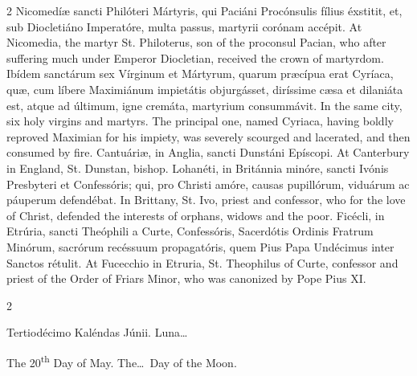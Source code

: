 \begin{paracol}{2}
\switchcolumn*
{}
Nicomedíæ sancti 
 Philóteri Mártyris, qui Paciáni Procónsulis fílius 
 éxstitit, et, sub 
 Diocletiáno Imperatóre, multa passus, martyrii corónam accépit.
\switchcolumn
{}
At Nicomedia, the martyr St. 
 Philoterus, son of the proconsul Pacian, who after suffering much under 
 Emperor Diocletian, received the crown of martyrdom.
\switchcolumn*
{}
Ibídem sanctárum sex 
 Vírginum et Mártyrum, quarum præcípua erat Cyríaca, quæ, cum líbere 
 Maximiánum impietátis objurgásset, diríssime cæsa et dilaniáta est, atque ad 
 últimum, igne cremáta, martyrium consummávit.
\switchcolumn
{}
In the same city, six holy virgins 
 and martyrs. The principal one, named Cyriaca, having boldly reproved 
 Maximian for his impiety, was severely scourged and lacerated, and then 
 consumed by fire.
\switchcolumn*
{}
Cantuáriæ, in Anglia, 
 sancti Dunstáni Epíscopi.
\switchcolumn
{}
At Canterbury in England, St. 
 Dunstan, bishop.
\switchcolumn*
{}
Lohanéti, in Británnia minóre, sancti Ivónis Presbyteri et Confessóris; qui, pro Christi amóre, 
 causas pupillórum, viduárum ac páuperum defendébat.
\switchcolumn
{}
In Brittany, St. Ivo, priest and 
 confessor, who for the love of Christ, defended the interests of orphans, 
 widows and the poor.
\switchcolumn*
{}
Ficécli, in Etrúria, 
 sancti Theóphili a Curte, Confessóris, Sacerdótis Ordinis Fratrum Minórum, 
 sacrórum recéssuum propagatóris, quem Pius Papa Undécimus inter Sanctos 
 rétulit.
\switchcolumn
{}
At Fucecchio in Etruria, St. 
 Theophilus of Curte, confessor and priest of the Order of Friars Minor, who 
 was canonized by Pope Pius XI.
\switchcolumn*
{}
\end{paracol}


\begin{paracol}{2}
\begin{center}{\color{gregoriocolor} Tertiodécimo Kaléndas Júnii. 
 Luna\dots\ }\end{center}
\switchcolumn
{}
\begin{center}{\color{gregoriocolor} The 
 20\textsuperscript{th} Day of May. The\dots\ Day of the Moon.}\end{center}
\end{paracol}

